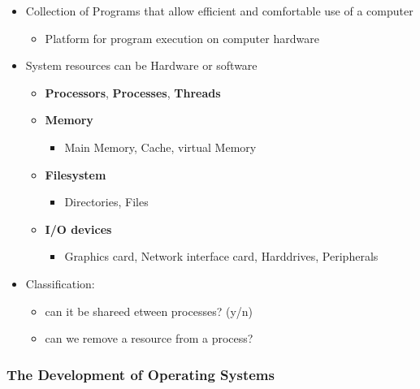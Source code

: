 \documentclass[
]{article}
\providecommand{\tightlist}{%
  \setlength{\itemsep}{0pt}\setlength{\parskip}{0pt}}
\begin{document}
\begin{itemize}
\tightlist
\item
  Collection of Programs that allow efficient and comfortable use of a
  computer

  \begin{itemize}
  \tightlist
  \item
    Platform for program execution on computer hardware
  \end{itemize}
\item
  System resources can be Hardware or software

  \begin{itemize}
  \tightlist
  \item
    \textbf{Processors}, \textbf{Processes}, \textbf{Threads}
  \item
    \textbf{Memory}

    \begin{itemize}
    \tightlist
    \item
      Main Memory, Cache, virtual Memory
    \end{itemize}
  \item
    \textbf{Filesystem}

    \begin{itemize}
    \tightlist
    \item
      Directories, Files
    \end{itemize}
  \item
    \textbf{I/O devices}

    \begin{itemize}
    \tightlist
    \item
      Graphics card, Network interface card, Harddrives, Peripherals
    \end{itemize}
  \end{itemize}
\item
  Classification:

  \begin{itemize}
  \tightlist
  \item
    can it be shareed etween processes? (y/n)
  \item
    can we remove a resource from a process?
  \end{itemize}
\end{itemize}

\hypertarget{the-development-of-operating-systems}{%
\subsubsection{The Development of Operating
Systems}\label{the-development-of-operating-systems}}
\end{document}
